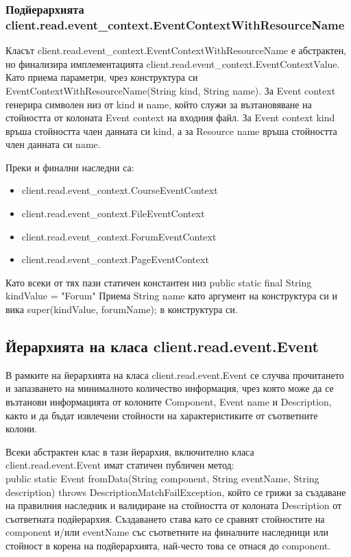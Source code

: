 \documentclass[a4paper, 12pt]{article}
\begin{document}
\subsubsection{Подйерархията client.read.event\_context.EventContextWithResourceName}
Класът client.read.event\_context.EventContextWithResourceName е абстрактен,
но финализира имплементацията client.read.event\_context.EventContextValue.
Като приема параметри, чрез конструктура си EventContextWithResourceName(String kind, String name).
За Event context генерира символен низ от kind и name,
който служи за възтановяване на стойността от колоната Event context на входния файл.
За Event context kind връша стойността член данната си kind, 
а за Resource name връша стойността член данната си name.

Преки и финални наследни са:
\begin{itemize}
\item client.read.event\_context.CourseEventContext
\item client.read.event\_context.FileEventContext
\item client.read.event\_context.ForumEventContext
\item client.read.event\_context.PageEventContext
\end{itemize}
Като всеки от тях пази статичен константен низ public static final String kindValue = "Forum"
Приема String name като аргумент на конструктура си и вика super(kindValue, forumName); в конструктура си. 

\subsection{Йерархията на класа client.read.event.Event}
В рамките на йерархията на класа client.read.event.Event се случва прочитането и запазването на минималното количество информация,
чрез която може да се възтанови информацията от колоните Component, Event name и Description,
както и да бъдат извлечени стойности на характеристиките от съответните колони.

Всеки абстрактен клас в тази йерархия, включително класа client.read.event.Event имат статичен публичен метод:\\
public static Event fromData(String component, String eventName, String description) throws DescriptionMatchFailException,
който се грижи за създаване на правилния наследник и валидиране на стойността от колоната Description от съответната подйерархия.
Създаването става като се сравнят стойностите на component и/или eventName със съответните на финалните наследници или стойност в корена на подйерархията, най-често това се отнася до component.
\end{document}
